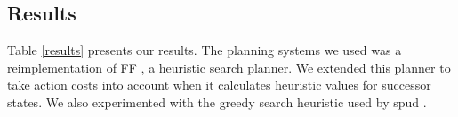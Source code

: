 



\subsection{Results}
Table \ref{results} presents our results.
The planning systems we used was a reimplementation of {\sc FF} \cite{hoffmannnebel2001}, a heuristic search planner. We extended this planner to take action costs into account when it calculates heuristic values for successor states. We also experimented with the greedy search heuristic used by {\sc spud} \cite{stonedoran1997}. 

